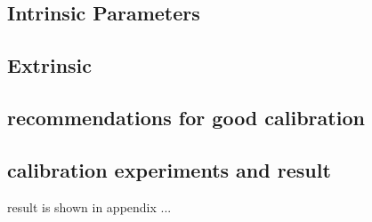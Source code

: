 \subsection{Intrinsic Parameters}

\subsection{Extrinsic}

\subsection{recommendations for good calibration}

\subsection{calibration experiments and result}
result is shown in appendix ...



